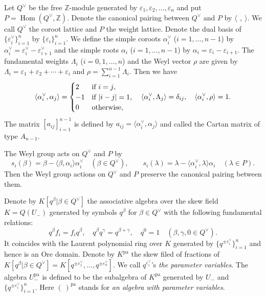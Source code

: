 \documentclass[12pt,twoside]{article}
\newcommand\tU{{\widetilde U}}
\newcommand\av{\alpha^\vee}
\newcommand\eps{\varepsilon}
\newcommand\epsv{\eps^\vee}
\newcommand\Qv{Q^\vee}
\newcommand\bra{\langle}
\newcommand\ket{\rangle}
\newcommand\Hom{\mathop{\mathrm{Hom}}\nolimits}
\newcommand\pa{{\mathrm{pa}}}
\newcommand\Z{{\mathbb Z}} %
\theoremstyle{plain} %
\theoremstyle{definition} %
\theoremstyle{definition} %
\numberwithin{theorem}{section}
\numberwithin{equation}{section}
\numberwithin{figure}{section}
\numberwithin{table}{section}
\begin{document}
Let $\Qv$ be the free $\Z$-module generated by $\eps_1,\eps_2,\ldots,\eps_n$
and put $P=\Hom(\Qv,\Z)$.
Denote the canonical pairing between $\Qv$ and $P$ by $\bra\,\ ,\ \ket$.
We call $\Qv$ the coroot lattice and $P$ the weight lattice.
Denote the dual basis of $\{\epsv_i\}_{i=1}^n$ by $\{\eps_i\}_{i=1}^n$.
We define the simple coroots $\av_i$ ($i=1,\ldots,n-1$) by $\av_i=\epsv_i-\epsv_{i+1}$
and the simple roots $\alpha_i$ ($i=1,\ldots,n-1$) by $\alpha_i=\eps_i-\eps_{i+1}$.
The fundamental weights $\Lambda_i$ ($i=0,1,\ldots,n$) 
and the Weyl vector $\rho$ are given by
$\Lambda_i = \eps_1+\eps_2+\cdots+\eps_i$ and $\rho=\sum_{i=1}^{n-1}\Lambda_i$.
Then we have
\begin{equation}
 \bra\av_i,\alpha_j\ket =
 \begin{cases}
   2 & \text{if $i=j$},  \\
  -1 & \text{if $|i-j|=1$}, \\
   0 & \text{otherwise}, \\ 
 \end{cases}
 \quad
 \bra\av_i,\Lambda_j\ket = \delta_{ij},
 \quad
 \bra\av_i,\rho\ket = 1.
 \label{eq:a_{ij}}
\end{equation}
The matrix $[a_{ij}]_{i=1}^{n-1}$ is defined by $a_{ij}=\bra\av_i,\alpha_j\ket$ and
called the Cartan matrix of type $A_{n-1}$.

The Weyl group acts on $\Qv$ and $P$ by
\begin{equation*}
 s_i(\beta) = \beta - \bra\beta,\alpha_i\ket\av_i \quad (\beta\in\Qv), \qquad
 s_i(\lambda) = \lambda - \bra\av_i,\lambda\ket\alpha_i \quad (\lambda\in P).
 \label{eq:Weyl-Q-P}
\end{equation*}
Then the Weyl group actions on $\Qv$ and $P$ preserve the canonical pairing
between them.
 
Denote by $K[q^\beta|\beta\in\Qv]$ the associative algebra over 
the skew field $K=Q(U_-)$ generated by symbols $q^\beta$
for $\beta\in\Qv$ with the following fundamental relations:
\begin{equation*}
 q^\beta f_i = f_i q^\beta, \quad
 q^\beta q^\gamma = q^{\beta+\gamma}, \quad
 q^0 = 1 \quad (\beta,\gamma,0\in\Qv).
\end{equation*}
It coincides with the Laurent polynomial ring over $K$ 
generated by $\{q^{\pm\epsv_i}\}_{i=1}^n$ 
and hence is an Ore domain.
Denote by $K^\pa$ the skew filed of fractions 
of $K[q^\beta|\beta\in\Qv]=K[q^{\pm\epsv_1},\ldots,q^{\pm\epsv_n}]$.
We call $q^{\epsv_i}$'s {\em the parameter variables}. 
The algebra $U_-^\pa$ %
is defined to be the subalgebra of $K^\pa$
generated by $U_-$ %
and $\{q^{\pm\epsv_i}\}_{i=1}^n$.
Here $(\ )^\pa$ stands for {\em an algebra with parameter variables}.
\end{document}
